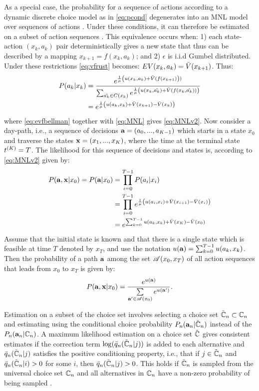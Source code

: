 As a special case, the probability for a sequence of actions according to a dynamic discrete choice model as in \eqref{eq:pcond} degenerates into an MNL model over sequences of actions \citep{fosgerau2013}. Under these conditions, it can therefore be estimated on a subset of action sequences \citep{mcfadden78}. This equivalence occurs when: 1) each state-action $(x_{k},a_{k})$ pair deterministically gives a new state that thus can be described by a mapping $x_{k+1}=f(x_{k},a_{k})$; and 2) $\epsilon$ is i.i.d Gumbel distributed. Under these restrictions \eqref{eq:vfrust} becomes: $EV(x_{k},a_{k})=\bar{V}(x_{k+1})$. Thus:
\begin{align}
P(a_k|x_k) &= \frac{e^{\frac{1}{\mu}\left(\avgu(x_k,a_k) + \ev(f(x_{k+1})\right))}}{\sum_{\akt \in C(x_k)}e^{\frac{1}{\mu}\left(\avgu(x_k,\akt) + \ev(f(x_k,\akt))\right)}} \label{eq:MNL}\\
&=e^{\frac{1}{\mu}\left(\avgu(a_k,x_k) + \ev(x_{k+1})- \ev(x_k)\right)}\label{eq:MNLv2}
\end{align}
where \eqref{eq:evfbellman} together with \eqref{eq:MNL} gives \eqref{eq:MNLv2}. Now consider a day-path, i.e., a sequence of decisions  ${\bf a} = (a_0,...,a_{K-1})$ which starts in a state $x_0$ and traverse the states ${\bf x} = (x_1,...,x_{K})$, where the time at the terminal state $t^{(K)}=T$. The likelihood for this sequence of decisions and states is, according to \eqref{eq:MNLv2} given by:
\begin{equation}\label{eq:pPath0}
\begin{aligned}
P(\ve{a},\ve{x}|x_0) = P(\ve{a}|x_0) &= \prod_{i=0}^{T-1}P(a_i|x_i) \\
& = \prod_{i=0}^{T-1} e^{\frac{1}{\mu}\left(\avgu(a_i,x_i) + \ev(x_{i+1})-\ev(x_i)\right)} \\
& =  e^{\sum_{k=0}^{T-1} \avgu(a_k,x_k) + \ev(x_{K})-\ev(x_0)} 
\end{aligned}
\end{equation}
Assume that the initial state is known and that there is a single state which is feasible at time $T$ denoted by $x_T$, and use the notation $u({\bf a})=\sum_{k=0}^{T-1} u(a_k,x_k)$. Then the probability of a path ${\bf a}$ among the set $\mathscr{A}(x_0,x_T)$ of all action sequences that leads from $x_0$ to $x_T$ is given by:
\begin{equation}
P(\ve{a},\ve{x}|x_0) = \frac{e^{u(\ve{a})}}{\sum\limits_{\ve{a'} \in \Agood(x_0)}e^{u(\ve{a'})} }.
\end{equation}

Estimation on a subset of the choice set involves selecting a choice set $\tilde{\mathbb{C}}_n \subset \mathbb{C}_n$ and estimating using the conditional choice probability $P_n({\bf a}_n|\tilde{\mathbb{C}}_n)$ instead of the $P_n({\bf a}_n|\mathbb{C}_n)$. A maximum likelihood estimation on a choice set $\tilde{\mathbb{C}}$ gives consistent estimates if the correction term $\log(\bar{q}_n(\tilde{\mathbb{C}}_n|j))$ is added to each alternative and $\bar{q}_n(\tilde{\mathbb{C}}_n|j)$ satisfies the positive conditioning property, i.e., that if $j\in \tilde{\mathbb{C}}_n$ and $\bar{q}_n(\tilde{\mathbb{C}}_n|i)>0$ for some $i$, then $\bar{q}_n(\tilde{\mathbb{C}}_n|j)>0$. This holds if $\tilde{\mathbb{C}}_n$ is sampled from the universal choice set $\mathbb{C}_n$ and all alternatives in $\mathbb{C}_n$ have a non-zero probability of being sampled \citep{mcfadden78}. 

